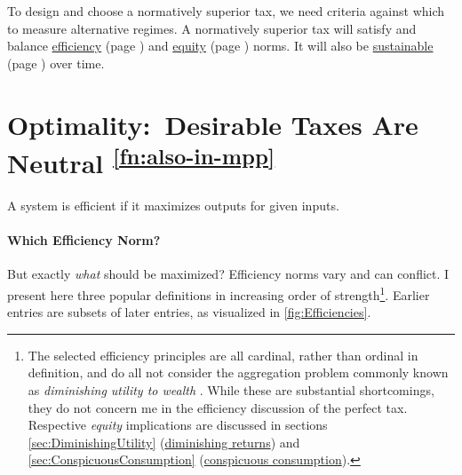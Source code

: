 



To design and choose a normatively superior tax, we need criteria against which to measure alternative regimes.
A normatively superior tax will satisfy and balance \hyperref[sec:Efficiency]{efficiency} (page \pageref{sec:Efficiency}) and \hyperref[sec:Equity]{equity} (page \pageref{sec:Equity}) norms.
It will also be \hyperref[sec:sustainability]{sustainable} (page \pageref{sec:Sustainability}) over time.

\section[Optimality]{Optimality:~Desirable Taxes Are Neutral \textsuperscript{\ref{fn:also-in-mpp}}} \label{sec:tax-optimality} %
A system is efficient if it maximizes outputs for given inputs.


\paragraph{Which Efficiency Norm?}
But exactly \emph{what} should be maximized?
Efficiency norms vary and can conflict.
I present here three popular definitions in increasing order of strength\footnote{
	The selected efficiency principles are all cardinal, rather than ordinal in definition, and do all not consider the aggregation problem commonly known as \emph{diminishing utility to wealth} \citep{Hicks1946}.
While these are substantial shortcomings, they do not concern me in the efficiency discussion of the perfect tax.
Respective \emph{equity} implications are discussed in sections \ref{sec:DiminishingUtility} (\hyperref[sec:DiminishingUtility]{diminishing returns}) and \ref{sec:ConspicuousConsumption} (\hyperref[sec:ConspicuousConsumption]{conspicuous consumption}).}.
Earlier entries are subsets of later entries, as visualized in \autoref{fig:Efficiencies}.

